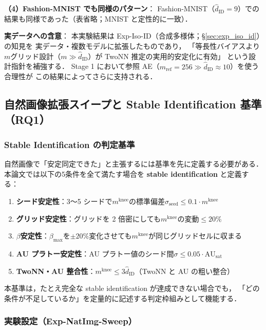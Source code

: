 \documentclass[11pt,a4paper]{jsarticle}
\newcommand{\AUsat}{\mathrm{AU}_{\mathrm{sat}}}
\newcommand{\mknee}{m^{\mathrm{knee}}}
\begin{document}
\textbf{（4）Fashion-MNIST でも同様のパターン}：
Fashion-MNIST（$\hat{d}_\mathrm{ID}=9$）での結果も同様であった（表省略；MNIST と定性的に一致）．

\textbf{実データへの含意}：
本実験結果は Exp-Iso-ID（合成多様体；§\ref{sec:exp_iso_id}）の知見を
実データ・複数モデルに拡張したものであり，
「等長性バイアスより$m$グリッド設計（$m \gg \hat{d}_\mathrm{ID}$）が TwoNN 推定の実用的安定化に有効」
という設計指針を補強する．
Stage 1 において参照 AE（$m_\mathrm{ref}=256 \gg \hat{d}_\mathrm{ID} \approx 10$）を使う合理性が
この結果によってさらに支持される．

\subsection{自然画像拡張スイープと Stable Identification 基準（RQ1）}\label{sec:exp_natimg_sweep}

\subsubsection*{Stable Identification の判定基準}\label{sec:natimg_stable_id}

自然画像で「安定同定できた」と主張するには基準を先に定義する必要がある．
本論文では以下の5条件を全て満たす場合を \textbf{stable identification} と定義する：

\begin{enumerate}
  \item \textbf{シード安定性}：3〜5 シードで$\mknee$の標準偏差$\sigma_\mathrm{seed} \leq 0.1 \cdot \mknee$
  \item \textbf{グリッド安定性}：グリッドを 2 倍密にしても$\mknee$の変動$\leq 20\%$
  \item \textbf{$\beta$安定性}：$\beta_{\max}$を$\pm 20\%$変化させても$\mknee$が同じグリッドセルに収まる
  \item \textbf{AU プラトー安定性}：AU プラトー値のシード間$\sigma \leq 0.05 \cdot \AUsat$
  \item \textbf{TwoNN・AU 整合性}：$\mknee \leq 3 \hat{d}_\mathrm{ID}$（TwoNN と AU の粗い整合）
\end{enumerate}

本基準は，たとえ完全な stable identification が達成できない場合でも，
「どの条件が不足しているか」を定量的に記述する判定枠組みとして機能する．

\subsubsection*{実験設定（Exp-NatImg-Sweep）}
\end{document}
